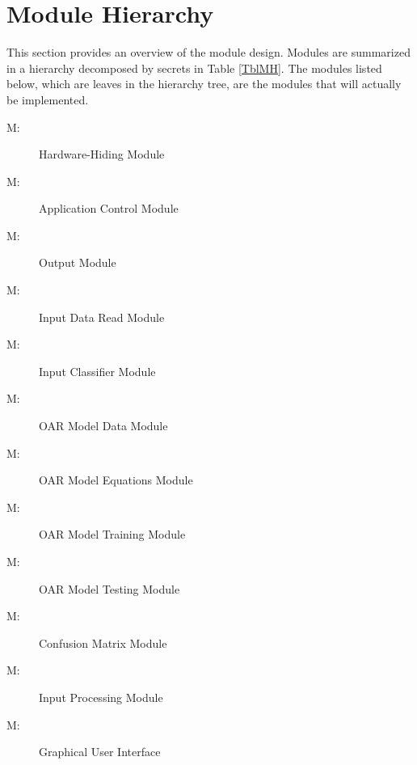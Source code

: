 \documentclass[12pt, titlepage]{article}
\newcounter{mnum}
\newcommand{\mthemnum}{M\themnum}
\begin{document}
\section{Module Hierarchy} \label{SecMH}

This section provides an overview of the module design. Modules are summarized
in a hierarchy decomposed by secrets in Table \ref{TblMH}. The modules listed
below, which are leaves in the hierarchy tree, are the modules that will
actually be implemented.

\begin{description}
\item [ \mthemnum \label{mHH}:] Hardware-Hiding Module
\item [ \mthemnum \label{mAC}:] Application Control Module
\item [ \mthemnum \label{mOU}:] Output Module
\item [ \mthemnum \label{mIDR}:] Input Data Read Module
\item [ \mthemnum \label{mIC}:] Input Classifier Module
\item [ \mthemnum \label{mOMD}:] OAR Model Data Module
\item [ \mthemnum \label{mOME}:] OAR Model Equations Module
\item [ \mthemnum \label{mOMTr}:] OAR Model Training Module
\item [ \mthemnum \label{mOMTs}:] OAR Model Testing Module
\item [ \mthemnum \label{mCMX}:] Confusion Matrix Module
\item [ \mthemnum \label{mIP}:] Input Processing Module
\item [ \mthemnum \label{mGUI}:] Graphical User Interface
\end{description}
\end{document}

